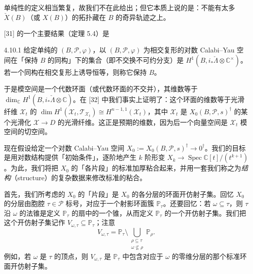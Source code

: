 单纯性的定义相当繁复，故我们不在此给出；但它本质上说的是：不能有太多 $\check X(B)$（或 $X(B)$）的拓扑藏在 $B$ 的奇异轨迹之上。

[31] 的一个主要结果（定理 5.4）是

\begin{theorem}{4.10.1}
给定单纯的 $(B,\mathcal{P},\varphi)$，以 $(B,\mathcal{P},\varphi)$ 为相交复形的对数 Calabi--Yau 空间在「保持 $B$ 的同构」下的集合（即不交换不可约分支）是 $H^1(B,i_*\check\Lambda\otimes\mathbb{C}^\times)$。若一个同构在相交复形上诱导恒等，则称它保持 $B$。
\end{theorem}

于是模空间是一个代数环面（或代数环面的不交并），其维数等于 $\dim_{\mathbb{C}}H^1(B,i_*\check\Lambda\otimes\mathbb{C})$。在 [32] 中我们事实上证明了：这个环面的维数等于光滑纤维 $\mathcal{X}_t$ 的 $\dim H^1(\mathcal{X}_t,\mathcal{T}_{\mathcal{X}_t})\cong H^{n-1,1}(\mathcal{X}_t)$，其中 $\mathcal{X}_t$ 是 $X_0(B,\mathcal{P},s)^\dagger$ 的某个光滑化 $\mathcal{X}\to D$ 的光滑纤维。这正是预期的维数，因为后一个向量空间是 $\mathcal{X}_t$ 模空间的切空间。

现在假设给定一个对数 Calabi--Yau 空间 $X_0:=X_0(B,\mathcal{P},s)^\dagger\to 0^\dagger$。我们的目标是用对数结构提供「初始条件」，逐阶地产生 $k$ 阶形变 $X_k\to\operatorname{Spec}\mathbb{C}[t]/(t^{k+1})$。为此，我们将把 $X_0$ 的「各片段」的标准加厚粘合起来，并用一套我们称之为\emph{结构}（structure）的复杂数据来修改标准的粘合。

首先，我们所考虑的 $X_0$ 的「片段」是 $X_0$ 的各分层的环面开仿射子集。回忆 $X_0$ 的分层由胞腔 $\tau\in\mathcal{P}$ 标号，对应于一个射影环面簇 $\mathbb{P}_\tau$。还要回忆：若 $\omega\subseteq\tau$，则 $\tau$ 沿 $\omega$ 的法锥是定义 $\mathbb{P}_\tau$ 的扇中的一个锥，从而定义 $\mathbb{P}_\tau$ 的一个开仿射子集。我们把这个开仿射子集记作 $V_{\omega,\tau}\subseteq\mathbb{P}_\tau$；注意
\[
V_{\omega,\tau}=\mathbb{P}_\tau\setminus\bigcup_{\substack{\rho\subseteq\tau\\ \omega\not\subseteq\rho}}\mathbb{P}_\rho.
\]
例如，若 $\omega$ 是 $\tau$ 的顶点，则 $V_{\omega,\tau}$ 是 $\mathbb{P}_\tau$ 中包含对应于 $\omega$ 的零维分层的那个标准环面开仿射子集。

